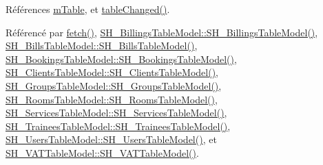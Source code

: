 Références \hyperlink{classSH__SqlDataModel_a88b8738a0d2803c94295c90c83d65f32}{m\-Table}, et \hyperlink{classSH__SqlDataModel_a791a6cc9d8a2ba109fe5f54ab287dc80}{table\-Changed()}.



Référencé par \hyperlink{classSH__SqlDataModel_ab6c206088250a66ddc8cb8d33a38e421}{fetch()}, \hyperlink{classSH__BillingsTableModel_a96183b1dd581519136c9b3932607f3d0}{S\-H\-\_\-\-Billings\-Table\-Model\-::\-S\-H\-\_\-\-Billings\-Table\-Model()}, \hyperlink{classSH__BillsTableModel_ab93c4113bb4f81833f9a3b7d9365ed3f}{S\-H\-\_\-\-Bills\-Table\-Model\-::\-S\-H\-\_\-\-Bills\-Table\-Model()}, \hyperlink{classSH__BookingsTableModel_a870c87c10391ca25985f3b8ea04cbaa6}{S\-H\-\_\-\-Bookings\-Table\-Model\-::\-S\-H\-\_\-\-Bookings\-Table\-Model()}, \hyperlink{classSH__ClientsTableModel_ac0fce2c2880ff26de22fce2abb6432a3}{S\-H\-\_\-\-Clients\-Table\-Model\-::\-S\-H\-\_\-\-Clients\-Table\-Model()}, \hyperlink{classSH__GroupsTableModel_a038761e5d85ea2d06867f4b28ffc6677}{S\-H\-\_\-\-Groups\-Table\-Model\-::\-S\-H\-\_\-\-Groups\-Table\-Model()}, \hyperlink{classSH__RoomsTableModel_a722f2c372e27e502e73f045b38301368}{S\-H\-\_\-\-Rooms\-Table\-Model\-::\-S\-H\-\_\-\-Rooms\-Table\-Model()}, \hyperlink{classSH__ServicesTableModel_ab21926661cb9374e9116a3236800caa7}{S\-H\-\_\-\-Services\-Table\-Model\-::\-S\-H\-\_\-\-Services\-Table\-Model()}, \hyperlink{classSH__TraineesTableModel_aa28ee863afaf81efdc5c6979060321e3}{S\-H\-\_\-\-Trainees\-Table\-Model\-::\-S\-H\-\_\-\-Trainees\-Table\-Model()}, \hyperlink{classSH__UsersTableModel_a04927caa4b15b925b2f30f362af25433}{S\-H\-\_\-\-Users\-Table\-Model\-::\-S\-H\-\_\-\-Users\-Table\-Model()}, et \hyperlink{classSH__VATTableModel_a64afdd54a316c5c4dbf7f700de3f5708}{S\-H\-\_\-\-V\-A\-T\-Table\-Model\-::\-S\-H\-\_\-\-V\-A\-T\-Table\-Model()}.


